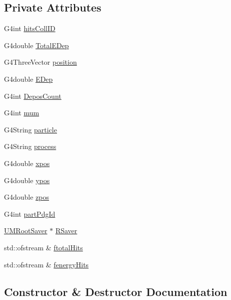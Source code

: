 \subsection*{Private Attributes}
\begin{DoxyCompactItemize}
\item 
G4int \hyperlink{classUMEventAction_a93249ca25c9565def0692d174a3e535e}{hits\+Coll\+I\+D}
\item 
G4double \hyperlink{classUMEventAction_a5a3fe12d0cc54f760499e76675044531}{Total\+E\+Dep}
\item 
G4\+Three\+Vector \hyperlink{classUMEventAction_aca4a227170c74e840a4ff2748efc20a2}{position}
\item 
G4double \hyperlink{classUMEventAction_a08ad731762fc90f81d56438383ee7bd8}{E\+Dep}
\item 
G4int \hyperlink{classUMEventAction_a55440e417cd0da1c627acb845a1108b9}{Depos\+Count}
\item 
G4int \hyperlink{classUMEventAction_a42d549a67c09ac22be18a0724b3f35ad}{mum}
\item 
G4\+String \hyperlink{classUMEventAction_a3bf2d2815501186c39a1985f47b2f5ab}{particle}
\item 
G4\+String \hyperlink{classUMEventAction_a2eabd29838c45226cc745aaeaee2a957}{process}
\item 
G4double \hyperlink{classUMEventAction_a006e73f519211d125c5f2ac070fbf489}{xpos}
\item 
G4double \hyperlink{classUMEventAction_a06f954b93a1ec5dc1e74dbd0f08fa258}{ypos}
\item 
G4double \hyperlink{classUMEventAction_a6a8137a0ba95725f0bcd80f9a433dcb0}{zpos}
\item 
G4int \hyperlink{classUMEventAction_a70cb8cc9f3d9820a85aedf4d245f5435}{part\+Pdg\+Id}
\item 
\hyperlink{classUMRootSaver}{U\+M\+Root\+Saver} $\ast$ \hyperlink{classUMEventAction_a1ad55dd713ab67a94b7989e09a7d19a9}{R\+Saver}
\item 
std\+::ofstream \& \hyperlink{classUMEventAction_a9bbd91659dd5720ff846cb231f8b8a81}{ftotal\+Hits}
\item 
std\+::ofstream \& \hyperlink{classUMEventAction_a0a8010739f4395ee799c2b7a106263b2}{fenergy\+Hits}
\end{DoxyCompactItemize}


\subsection{Constructor \& Destructor Documentation}
\hypertarget{classUMEventAction_a81e4b6ebea6a9c34692964c08bd1a7c8}{}
